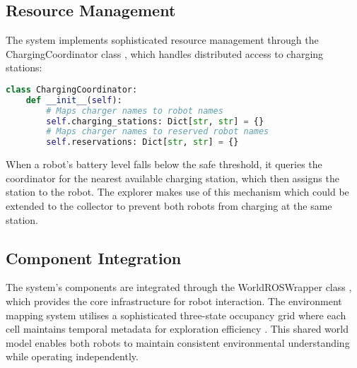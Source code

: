 \documentclass{csfourzero}
\begin{document}

\subsection{Resource Management}

The system implements sophisticated resource management through the ChargingCoordinator class \cite{burgard2002coordinated}, which handles distributed access to charging stations:

\begin{lstlisting}[language=Python]
class ChargingCoordinator:
    def __init__(self):
        # Maps charger names to robot names
        self.charging_stations: Dict[str, str] = {}
        # Maps charger names to reserved robot names
        self.reservations: Dict[str, str] = {}
\end{lstlisting}

When a robot's battery level falls below the safe threshold, it queries the coordinator for the nearest available charging station, which then assigns the station to the robot. The explorer makes use of this mechanism which could be extended to the collector to prevent both robots from charging at the same station.

\subsection{Component Integration}

The system's components are integrated through the WorldROSWrapper class \cite{pyrobosim-docs}, which provides the core infrastructure for robot interaction. The environment mapping system utilises a sophisticated three-state occupancy grid where each cell maintains temporal metadata for exploration efficiency \cite{Thrun2003}. This shared world model enables both robots to maintain consistent environmental understanding while operating independently.
\end{document}
